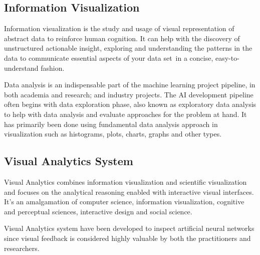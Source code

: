 \subsection{Information Visualization}

Information visualization is the study and usage of visual representation of abstract data to reinforce human cognition. It can help with the discovery of unstructured actionable insight, exploring and understanding the patterns in the data to communicate essential aspects of your data set in a concise, easy-to-understand fashion.

Data analysis is an indispensable part of the machine learning project pipeline, in both academia and research; and industry projects. The AI development pipeline often begins with data exploration phase, also known as exploratory data analysis to help with data analysis and evaluate approaches for the problem at hand. It has primarily been done using fundamental data analysis approach in visualization such as histograms, plots, charts, graphs and other types.

\subsection{Visual Analytics System}
    
Visual Analytics combines information visualization and scientific visualization and focuses on the analytical reasoning enabled with interactive visual interfaces. It’s an amalgamation of computer science, information visualization, cognitive and perceptual sciences, interactive design and social science.

Visual Analytics system have been developed to inspect artificial neural networks since visual feedback is considered highly valuable by both the practitioners and researchers.


